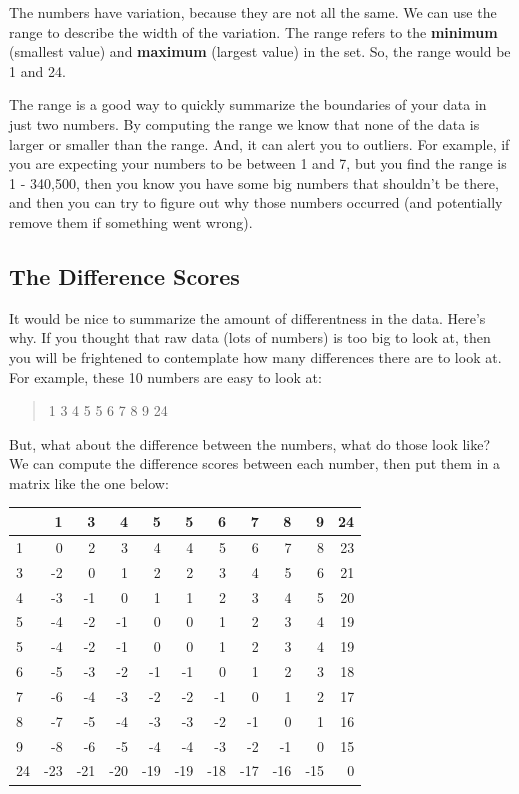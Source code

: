 \documentclass[
]{book}
\begin{document}
The numbers have variation, because they are not all the same. We can use the range to describe the width of the variation. The range refers to the \textbf{minimum} (smallest value) and \textbf{maximum} (largest value) in the set. So, the range would be 1 and 24.

The range is a good way to quickly summarize the boundaries of your data in just two numbers. By computing the range we know that none of the data is larger or smaller than the range. And, it can alert you to outliers. For example, if you are expecting your numbers to be between 1 and 7, but you find the range is 1 - 340,500, then you know you have some big numbers that shouldn't be there, and then you can try to figure out why those numbers occurred (and potentially remove them if something went wrong).

\subsection{The Difference Scores}\label{the-difference-scores}

It would be nice to summarize the amount of differentness in the data. Here's why. If you thought that raw data (lots of numbers) is too big to look at, then you will be frightened to contemplate how many differences there are to look at. For example, these 10 numbers are easy to look at:

\begin{quote}
1 3 4 5 5 6 7 8 9 24
\end{quote}

But, what about the difference between the numbers, what do those look like? We can compute the difference scores between each number, then put them in a matrix like the one below:

\begin{tabular}{l|r|r|r|r|r|r|r|r|r|r}
\hline
  & 1 & 3 & 4 & 5 & 5 & 6 & 7 & 8 & 9 & 24\\
\hline
1 & 0 & 2 & 3 & 4 & 4 & 5 & 6 & 7 & 8 & 23\\
\hline
3 & -2 & 0 & 1 & 2 & 2 & 3 & 4 & 5 & 6 & 21\\
\hline
4 & -3 & -1 & 0 & 1 & 1 & 2 & 3 & 4 & 5 & 20\\
\hline
5 & -4 & -2 & -1 & 0 & 0 & 1 & 2 & 3 & 4 & 19\\
\hline
5 & -4 & -2 & -1 & 0 & 0 & 1 & 2 & 3 & 4 & 19\\
\hline
6 & -5 & -3 & -2 & -1 & -1 & 0 & 1 & 2 & 3 & 18\\
\hline
7 & -6 & -4 & -3 & -2 & -2 & -1 & 0 & 1 & 2 & 17\\
\hline
8 & -7 & -5 & -4 & -3 & -3 & -2 & -1 & 0 & 1 & 16\\
\hline
9 & -8 & -6 & -5 & -4 & -4 & -3 & -2 & -1 & 0 & 15\\
\hline
24 & -23 & -21 & -20 & -19 & -19 & -18 & -17 & -16 & -15 & 0\\
\hline
\end{tabular}
\end{document}

